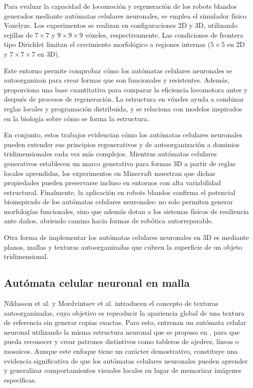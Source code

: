Para evaluar la capacidad de locomoción y regeneración de los robots blandos generados mediante autómatas celulares neuronales, se emplea el simulador físico Voxelyze. Los experimentos se realizan en configuraciones 2D y 3D, utilizando rejillas de $7 \times 7$ y $9 \times 9 \times 9$ vóxeles, respectivamente. Las condiciones de frontera tipo Dirichlet limitan el crecimiento morfológico a regiones internas ($5 \times 5$ en 2D y $7 \times 7 \times 7$ en 3D).

Este entorno permite comprobar cómo los autómatas celulares neuronales se autoorganizan para crear formas que son funcionales y resistentes. Además, proporciona una base cuantitativa para comparar la eficiencia locomotora antes y después de procesos de regeneración. La estructura en vóxeles ayuda a combinar reglas locales y programación distribuida, y se relaciona con modelos inspirados en la biología sobre cómo se forma la estructura.

En conjunto, estos trabajos evidencian cómo los autómatas celulares neuronales pueden extender sus principios regenerativos y de autoorganización a dominios tridimensionales cada vez más complejos. Mientras autómatas celulares generativos establecen un marco generativo para formas 3D a partir de reglas locales aprendidas, los experimentos en Minecraft muestran que dichas propiedades pueden preservarse incluso en entornos con alta variabilidad estructural. Finalmente, la aplicación en robots blandos confirma el potencial bioinspirado de los autómatas celulares neuronales: no solo permiten generar morfologías funcionales, sino que además dotan a los sistemas físicos de resiliencia ante daños, abriendo camino hacia formas de robótica autorreparable.

Otra forma de implementar los autómatas celulares neuronales en 3D es mediante planos, mallas y texturas autoorganizadas que cubren la superficie de un objeto tridimensional. 

\subsection{Autómata celular neuronal en malla}

Niklasson et al. \cite{mordvintsev2021_mnca} y Mordvintsev et al. \cite{mordvintsev2021_mnca2} \cite{mordvintsev2021_unca} introducen el concepto de texturas autoorganizadas, cuyo objetivo es reproducir la apariencia global de una textura de referencia sin generar copias exactas. Para esto, entrenan un autómata celular neuronal utilizando la misma estructura neuronal que se propuso en \cite{mordvintsev2020_nca}, para que pueda reconocer y crear patrones distintivos como tableros de ajedrez, líneas o mosaicos. Aunque este enfoque tiene un carácter demostrativo, constituye una evidencia significativa de que los autómatas celulares neuronales pueden aprender y generalizar comportamientos visuales locales en lugar de memorizar imágenes específicas.

